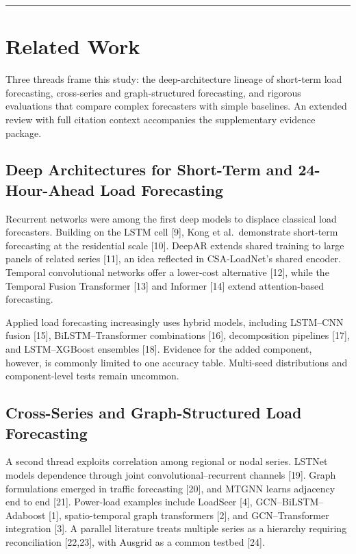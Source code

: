 \documentclass[electronics,article,submit,moreauthors]{Definitions/mdpi}
\begin{document}
\begin{center}\rule{0.5\linewidth}{0.5pt}\end{center}

\section{Related Work}\label{related-work}

Three threads frame this study: the deep-architecture lineage of short-term load forecasting, cross-series and graph-structured forecasting, and rigorous evaluations that compare complex forecasters with simple baselines. An extended review with full citation context accompanies the supplementary evidence package.

\subsection{Deep Architectures for Short-Term and 24-Hour-Ahead Load Forecasting}\label{deep-architectures-for-short-term-and-24-hour-ahead-load-forecasting}

Recurrent networks were among the first deep models to displace classical load forecasters. Building on the LSTM cell {[}9{]}, Kong et al.~demonstrate short-term forecasting at the residential scale {[}10{]}. DeepAR extends shared training to large panels of related series {[}11{]}, an idea reflected in CSA-LoadNet's shared encoder. Temporal convolutional networks offer a lower-cost alternative {[}12{]}, while the Temporal Fusion Transformer {[}13{]} and Informer {[}14{]} extend attention-based forecasting.

Applied load forecasting increasingly uses hybrid models, including LSTM--CNN fusion {[}15{]}, BiLSTM--Transformer combinations {[}16{]}, decomposition pipelines {[}17{]}, and LSTM--XGBoost ensembles {[}18{]}. Evidence for the added component, however, is commonly limited to one accuracy table. Multi-seed distributions and component-level tests remain uncommon.

\subsection{Cross-Series and Graph-Structured Load Forecasting}\label{cross-series-and-graph-structured-load-forecasting}

A second thread exploits correlation among regional or nodal series. LSTNet models dependence through joint convolutional--recurrent channels {[}19{]}. Graph formulations emerged in traffic forecasting {[}20{]}, and MTGNN learns adjacency end to end {[}21{]}. Power-load examples include LoadSeer {[}4{]}, GCN--BiLSTM--Adaboost {[}1{]}, spatio-temporal graph transformers {[}2{]}, and GCN--Transformer integration {[}3{]}. A parallel literature treats multiple series as a hierarchy requiring reconciliation {[}22,23{]}, with Ausgrid as a common testbed {[}24{]}.
\end{document}
